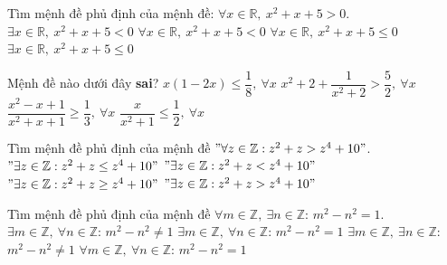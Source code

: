 \begin{ex}%
	 Tìm mệnh đề phủ định của mệnh đề: $\forall x\in \mathbb{R}, \ x^2+x+5>0$.
	 \choice
		{$\exists  x\in \mathbb{R}, \ x^2+x+5<0$}
		{$\forall x\in \mathbb{R}, \ x^2+x+5<0$} 
		 {$\forall x\in \mathbb{R}, \ x^2+x+5\leqslant 0$}
		{\True $\exists x\in \mathbb{R}, \ x^2+x+5\leqslant  0$}
\end{ex}

\begin{ex}%
	 Mệnh đề nào dưới đây \textbf{sai}?
	 \choice
		{$x(1-2x)\leqslant \dfrac{1}{8}, \ \forall x$} 
		{\True  $x^2+2+\dfrac{1}{x^2+2}>\dfrac{5}{2}, \ \forall x$}
		 {$\dfrac{x^2-x+1}{x^2+x+1}\geqslant \dfrac{1}{3}, \ \forall x$}
		{$\dfrac{x}{x^2+1}\leqslant \dfrac{1}{2}, \ \forall x$} 
\end{ex}

\begin{ex}%
	Tìm mệnh đề phủ định của mệnh đề $"\forall z  \in \mathbb{Z} : z^2+z > z^4+10"$.
	\choice 
		{\True $"\exists z \in \mathbb{Z}  : z^2+z \leq z^4+10"$}
		{$"\exists z \in \mathbb{Z} : z^2+z  < z^4+10"$}
		{$"\exists z \in \mathbb{Z}  : z^2+z \geq z^4+10"$}
		{$"\exists z \in \mathbb{Z} : z^2+z >  z^4+10"$}
\end{ex}

\begin{ex}%
	Tìm mệnh đề phủ định của  mệnh đề
	 $\forall m \in \mathbb{Z},\ \exists n \in \mathbb{Z} $: $m^2-n^2=1$.
	 \choice
		{\True $\exists m \in  \mathbb{Z},\ \forall n \in \mathbb{Z} $: $m^2-n^2 \neq 1$}
		{$\exists m \in \mathbb{Z},\ \forall n \in \mathbb{Z} $:  $m^2-n^2 = 1$}
		{$\exists m \in \mathbb{Z},\ \exists n \in \mathbb{Z} $: $m^2-n^2 \neq  1$}
		{$\forall m \in \mathbb{Z},\ \forall n \in \mathbb{Z}  $: $m^2-n^2 =1$}
\end{ex}

